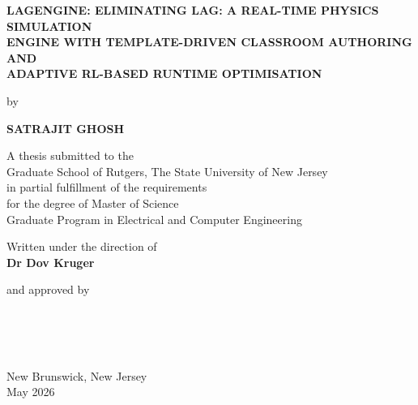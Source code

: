 \documentclass[9pt,openany]{extbook}
\begin{document}
\begin{titlepage}
\thispagestyle{empty}

\begingroup
\singlespacing

\begin{center}

\vspace*{0.45in}

\textbf{
LAGENGINE: ELIMINATING LAG: A REAL-TIME PHYSICS SIMULATION\\
ENGINE WITH TEMPLATE-DRIVEN CLASSROOM AUTHORING AND\\
ADAPTIVE RL-BASED RUNTIME OPTIMISATION
}

\vspace{0.65in}

by

\vspace{0.2in}

\textbf{SATRAJIT GHOSH}

\vspace{0.55in}

A thesis submitted to the\\
Graduate School of Rutgers, The State University of New Jersey\\
in partial fulfillment of the requirements\\
for the degree of Master of Science\\
Graduate Program in Electrical and Computer Engineering

\vspace{0.65in}

Written under the direction of\\
\textbf{Dr Dov Kruger}

\vspace{0.4in}

and approved by

\vspace{0.3in}

\underline{\hspace{3.5in}}\\[0.28in]
\underline{\hspace{3.5in}}\\[0.28in]
\underline{\hspace{3.5in}}\\[0.28in]
\underline{\hspace{3.5in}}

\vfill

New Brunswick, New Jersey\\
May 2026

\end{center}

\endgroup
\end{titlepage}
\end{document}
